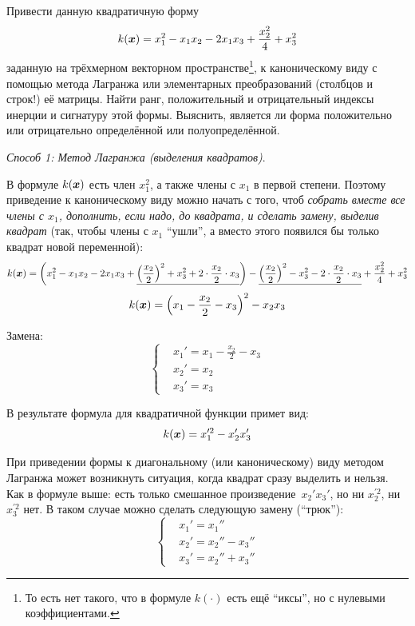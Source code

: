 \documentclass[a4paper,12pt]{article}
\begin{document}
  Привести данную квадратичную форму
  \[
    k(\boldsymbol x) = x_1^2 - x_1 x_2 - 2 x_1 x_3 + \frac{x_2^2}{4} + x_3^2
  \]
  заданную на трёхмерном векторном пространстве\footnote{То есть нет такого, что в формуле $k(\cdot)$ есть ещё ``иксы'', но с нулевыми коэффициентами.}, к каноническому виду с помощью метода Лагранжа или элементарных преобразований (столбцов и строк!) её матрицы.
  Найти ранг, положительный и отрицательный индексы инерции и сигнатуру этой формы.
  Выяснить, является ли форма положительно или отрицательно определённой или полуопределённой.
  
  \begin{solution}
    {}\hfill\par
    
    \emph{Способ 1: Метод Лагранжа (выделения квадратов)}.

    В формуле $k(\boldsymbol x)$ есть член $x_1^2$, а также члены с $x_1$ в первой степени.
    Поэтому приведение к каноническому виду можно начать с того, чтоб \emph{собрать вместе все члены с $x_1$, дополнить, если надо, до квадрата, и сделать замену, выделив квадрат} (так, чтобы члены с $x_1$ ``ушли'', а вместо этого появился бы только квадрат новой переменной):
    \[
      k(\boldsymbol x) = \left(x_1^2 - x_1 x_2 - 2 x_1 x_3 + \underline{\left(\frac{x_2}{2}\right)^2 + x_3^2 + 2 \cdot \frac{x_2}{2} \cdot x_3}\right) - \underline{\left(\frac{x_2}{2}\right)^2 - x_3^2 - 2 \cdot \frac{x_2}{2} \cdot x_3} + \frac{x_2^2}{4} + x_3^2
    \]
    \[
      k(\boldsymbol x) = \left(x_1 - \frac{x_2}{2} - x_3\right)^2 - x_2 x_3
    \]
    
    Замена:
    \begin{equation}\label{eq:p1-var-change1}
      \left\{
        \begin{aligned}
          &x_1' = x_1 - \frac{x_2}{2} - x_3\\
          &x_2' = x_2\\
          &x_3' = x_3
        \end{aligned}
      \right.
    \end{equation}
    
    В результате формула для квадратичной функции примет вид:
    \[
      k(\boldsymbol x) = x_1^{\prime 2} - x_2' x_3'
    \]
    
    При приведении формы к диагональному (или каноническому) виду методом Лагранжа может возникнуть ситуация, когда квадрат сразу выделить и нельзя.
    Как в формуле выше: есть только смешанное произведение~$x_2' x_3'$, но ни $x_2^{\prime 2}$, ни $x_3^{\prime 2}$ нет.
    В таком случае можно сделать следующую замену (``трюк''):
    \begin{equation}\label{eq:p1-var-change2}
      \left\{
        \begin{aligned}
          &x_1' = x_1''\\
          &x_2' = x_2'' - x_3''\\
          &x_3' = x_2'' + x_3''
        \end{aligned}
      \right.
    \end{equation}
    

\end{solution}
\end{document}
